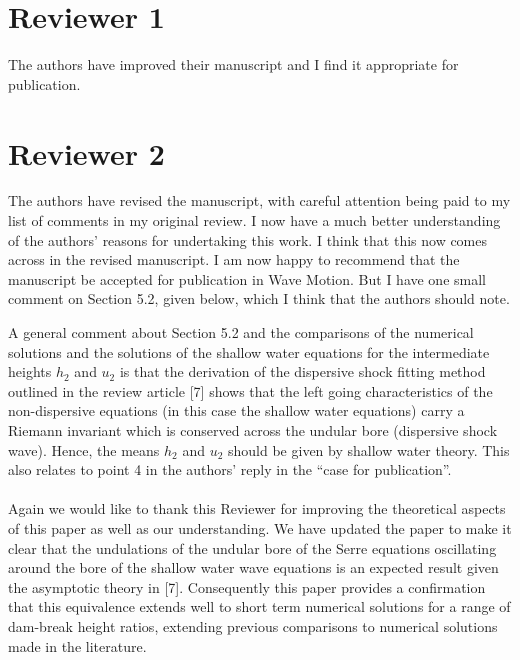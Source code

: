 \documentclass[times]{article}
\begin{document}
	\section{Reviewer 1}
	 The authors have improved their manuscript and I find it appropriate for publication.
	
	\section{Reviewer 2}
	The authors have revised the manuscript, with careful attention being paid to my list of
	comments in my original review. I now have a much better understanding of the authors’ reasons for undertaking this work. I think that this now comes across in the revised manuscript.
	I am now happy to recommend that the manuscript be accepted for publication in Wave
	Motion. But I have one small comment on Section 5.2, given below, which I think that the
	authors should note.
	
	A general comment about Section 5.2 and the comparisons of the numerical solutions and
	the solutions of the shallow water equations for the intermediate heights $h_2$ and $u_2$ is that the
	derivation of the dispersive shock fitting method outlined in the review article [7] shows that
	the left going characteristics of the non-dispersive equations (in this case the shallow water
	equations) carry a Riemann invariant which is conserved across the undular bore (dispersive
	shock wave). Hence, the means $h_2$ and $u_2$ should be given by shallow water theory. This also
	relates to point 4 in the authors’ reply in the ``case for publication''.
		\\ \\
		{\color{blue} Again we would like to thank this Reviewer for improving the theoretical aspects of this paper as well as our understanding. We have updated the paper to make it clear that the undulations of the undular bore of the Serre equations oscillating around the bore of the shallow water wave equations is an expected result given the asymptotic theory in [7]. Consequently this paper provides a confirmation that this equivalence extends well to short term numerical solutions for a range of dam-break height ratios, extending previous comparisons to numerical solutions made in the literature.} \\ \\
\end{document}
